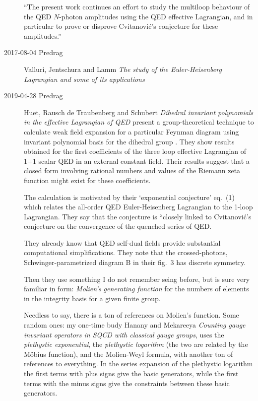 \begin{description}
``The present work continues an
effort to study the multiloop
behaviour of the QED $N$-photon amplitudes using the QED effective
Lagrangian, and in particular to prove or disprove Cvitanovi\'c's
conjecture for these amplitudes.''

\item[2017-08-04 Predrag]
Valluri, Jentschura and Lamm
{\em The study of the {Euler-Heisenberg Lagrangian} and some of its applications}

\item[2019-04-28 Predrag]
Huet, Rausch de Traubenberg and Schubert
{\em Dihedral invariant polynomials in the effective {Lagrangian} of {QED}}
present a group-theoretical technique to calculate weak field expansion for a
particular Feynman diagram using invariant polynomial basis for the dihedral
group . They show results obtained for the first coefficients of the three
loop effective Lagrangian of 1+1 scalar QED in an external constant field. Their results
suggest that a closed form involving rational numbers and values of the Riemann
zeta function might exist for these coefficients.

The calculation is motivated by their `exponential conjecture' eq.~(1) which
relates the all-order QED Euler-Heisenberg Lagrangian to the 1-loop Lagrangian.
They say that the conjecture is ``closely linked to Cvitanovi\'c's
conjecture on the convergence of the quenched series of QED.

They already know that QED self-dual fields provide substantial computational
simplifications.
They note that the crossed-photons, Schwinger-parametrized  diagram B in their
fig.~3 has  discrete symmetry.

Then they use something I do not remember seing before, but is sure very familiar
in form: \emph{Molien's generating function}
 for the numbers of elements in the
integrity basis for a given finite group.

Needless to say, there is a ton of references on Molien's function. Some random
ones: my one-time budy
Hanany and Mekareeya
{\em Counting gauge invariant operators in {SQCD} with classical gauge groups},
 uses the \emph{plethystic exponential}, the \emph{plethystic
logarithm} (the two are related by the M\"obius  function), and the Molien-Weyl
formula, with another ton of references to everything. In the  series  expansion
of  the plethystic logarithm the first  terms with  plus  signs give  the  basic
generators, while the first terms with the minus signs give the constraints
between these basic generators.


\end{description}
